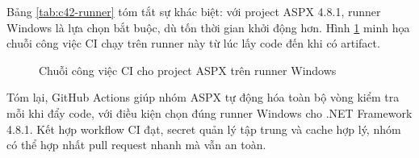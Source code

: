 Bảng \ref{tab:c42-runner} tóm tắt sự khác biệt: với project ASPX 4.8.1, runner Windows là lựa chọn bắt buộc,
dù tốn thời gian khởi động hơn. Hình \ref{fig:c42-pipeline} minh họa chuỗi công việc CI
chạy trên runner này từ lúc lấy code đến khi có artifact.

\begin{figure}[H]
\centering
{}
\caption{Chuỗi công việc CI cho project ASPX trên runner Windows}
\label{fig:c42-pipeline}
\end{figure}

Tóm lại, GitHub Actions giúp nhóm ASPX tự động hóa toàn bộ vòng kiểm tra mỗi khi đẩy code,
với điều kiện chọn đúng runner Windows cho .NET Framework 4.8.1. Kết hợp workflow CI đạt,
secret quản lý tập trung và cache hợp lý, nhóm có thể hợp nhất pull request nhanh mà vẫn an toàn.